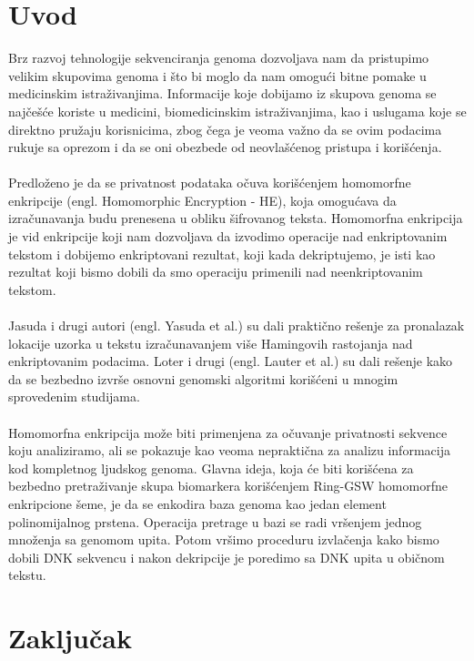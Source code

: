 \documentclass[a4paper]{article}
\begin{document}
\section{Uvod}
\label{sec:uvod}
Brz razvoj tehnologije sekvenciranja genoma dozvoljava nam da pristupimo velikim skupovima genoma i što bi moglo da nam omogući bitne pomake u medicinskim istraživanjima. Informacije koje dobijamo iz skupova genoma se najčešće koriste u medicini, biomedicinskim istraživanjima, kao i uslugama koje se direktno pružaju korisnicima, zbog čega je veoma važno da se ovim podacima rukuje sa oprezom i da se oni obezbede od neovlašćenog pristupa i korišćenja.\\\\
Predloženo je da se privatnost podataka očuva korišćenjem homomorfne enkripcije (engl. Homomorphic Encryption - HE), koja omogućava da izračunavanja budu prenesena u obliku šifrovanog teksta.
Homomorfna enkripcija je vid enkripcije koji nam dozvoljava da izvodimo operacije nad enkriptovanim tekstom i dobijemo enkriptovani rezultat, koji kada dekriptujemo, je isti kao rezultat koji bismo dobili da smo operaciju primenili nad neenkriptovanim tekstom.\\\\ Jasuda i drugi autori (engl. Yasuda et al.) su dali praktično rešenje za pronalazak lokacije uzorka u tekstu izračunavanjem više Hamingovih rastojanja nad enkriptovanim podacima. Loter i drugi (engl. Lauter et al.) su dali rešenje kako da se bezbedno izvrše osnovni genomski algoritmi korišćeni u mnogim sprovedenim studijama.\\\\
Homomorfna enkripcija može biti primenjena za očuvanje privatnosti sekvence koju analiziramo, ali se pokazuje kao veoma nepraktična za analizu informacija kod kompletnog ljudskog genoma.
Glavna ideja, koja će biti korišćena za bezbedno pretraživanje skupa biomarkera korišćenjem Ring-GSW homomorfne enkripcione šeme, je da se enkodira baza genoma kao jedan element polinomijalnog prstena. Operacija pretrage u bazi se radi vršenjem jednog množenja sa genomom upita. Potom vršimo proceduru izvlačenja kako bismo dobili DNK sekvencu i nakon dekripcije je poredimo sa DNK upita u običnom tekstu. 


\section{Zaključak}
\label{sec:zakljucak}


\appendix
 

\end{document}
